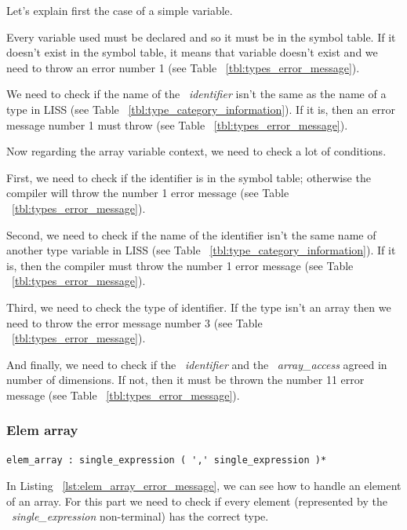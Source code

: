 \documentclass[
  oneside,
  11pt, a4paper,
  footinclude=true,
  headinclude=true,
  cleardoublepage=empty
]{scrbook}
\begin{document}
Let's explain first the case of a simple variable.


Every variable used must be declared and so it must be in the symbol table. If it doesn't exist in the symbol table, it means that variable doesn't exist and we need to throw an error number 1 (see Table ~\ref{tbl:types_error_message}).

We need to check if the name of the ~\textit{identifier} isn't the same as the name of a type in LISS (see Table ~\ref{tbl:type_category_information}). If it is, then an error message number 1 must throw (see Table ~\ref{tbl:types_error_message}).

Now regarding the array variable context, we need to check a lot of conditions.

First, we need to check if the identifier is in the symbol table; otherwise the compiler will throw the number 1 error message (see Table ~\ref{tbl:types_error_message}).
 
Second, we need to check if the name of the identifier isn't the same name of another type variable in LISS (see Table ~\ref{tbl:type_category_information}). If it is, then the compiler must throw the number 1 error message (see Table ~\ref{tbl:types_error_message}).

Third, we need to check the type of identifier. If the type isn't an array then we need to throw the error message number 3 (see Table ~\ref{tbl:types_error_message}).

And finally, we need to check if the ~\textit{identifier} and the ~\textit{array\_access} agreed in number of dimensions. If not, then it must be thrown the number 11 error message (see Table ~\ref{tbl:types_error_message}).

\subsubsection{Elem array}

\begin{lstlisting}[caption={Elem\_array rule in LISS},label={lst:elem_array_error_message}]
  elem_array : single_expression ( ',' single_expression )*
\end{lstlisting}

In Listing ~\ref{lst:elem_array_error_message}, we can see how to handle an element of an array.
For this part we need to check if every element (represented by the ~\textit{single\_expression} non-terminal) has the correct type.
\end{document}
